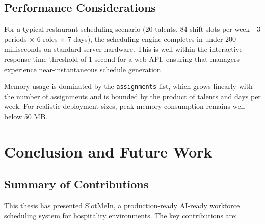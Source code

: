 \section{Performance Considerations}

For a typical restaurant scheduling scenario (20 talents, 84 shift slots per week—3 periods × 6 roles × 7 days), the scheduling engine completes in under 200 milliseconds on standard server hardware. This is well within the interactive response time threshold of 1 second \cite{nielsen_1993} for a web API, ensuring that managers experience near-instantaneous schedule generation.

Memory usage is dominated by the \texttt{assignments} list, which grows linearly with the number of assignments and is bounded by the product of talents and days per week. For realistic deployment sizes, peak memory consumption remains well below 50 MB.

\chapter{Conclusion and Future Work}

\section{Summary of Contributions}

This thesis has presented SlotMeIn, a production-ready AI-ready workforce scheduling system for hospitality environments. The key contributions are:

